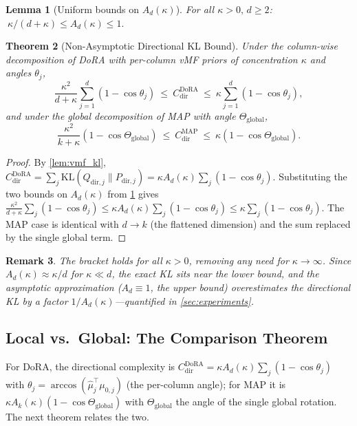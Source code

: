 \documentclass[10pt]{article}
\newtheorem{theorem}{Theorem}[section]
\newtheorem{lemma}[theorem]{Lemma}
\newtheorem{remark}[theorem]{Remark}
\newcommand{\KL}{\mathrm{KL}}
\newcommand{\Ad}{A_d}
\newcommand{\Ak}{A_k}
\newcommand{\Thetaglob}{\Theta_{\mathrm{global}}}
\begin{document}
\begin{lemma}[Uniform bounds on $\Ad(\kappa)$]\label{lem:ad_bounds}
For all $\kappa>0,\,d\ge2$: $\ \kappa/(d+\kappa)\le \Ad(\kappa)\le1.$
\end{lemma}

\setcounter{theorem}{3} %
\begin{theorem}[Non-Asymptotic Directional KL Bound]\label{thm:nonasymptotic}
Under the column-wise decomposition of DoRA with per-column vMF priors of
concentration $\kappa$ and angles $\theta_j$,
\[
\frac{\kappa^2}{d+\kappa}\sum_{j=1}^d(1-\cos\theta_j)
\ \le\ C^{\mathrm{DoRA}}_{\mathrm{dir}}
\ \le\ \kappa\sum_{j=1}^d(1-\cos\theta_j),
\]
and under the global decomposition of MAP with angle $\Thetaglob$,
\[
\frac{\kappa^2}{k+\kappa}(1-\cos\Thetaglob)
\ \le\ C^{\mathrm{MAP}}_{\mathrm{dir}}
\ \le\ \kappa(1-\cos\Thetaglob).
\]
\end{theorem}
\begin{proof}
By \cref{lem:vmf_kl}, $C^{\mathrm{DoRA}}_{\mathrm{dir}}=\sum_{j}\KL(Q_{\mathrm{dir},j}\|P_{\mathrm{dir},j})
=\kappa \Ad(\kappa)\sum_j(1-\cos\theta_j)$. Substituting the two bounds on $\Ad(\kappa)$
from \cref{lem:ad_bounds} gives
$\frac{\kappa^2}{d+\kappa}\sum_j(1-\cos\theta_j)\le\kappa \Ad(\kappa)\sum_j(1-\cos\theta_j)\le\kappa\sum_j(1-\cos\theta_j)$.
The MAP case is identical with $d\!\to\!k$ (the flattened dimension) and the sum
replaced by the single global term.
\end{proof}

\begin{remark}\label{rem:nonasym}
The bracket holds for all $\kappa>0$, removing any need for $\kappa\to\infty$. Since
$\Ad(\kappa)\approx\kappa/d$ for $\kappa\ll d$, the exact KL sits near the lower bound,
and the asymptotic approximation ($\Ad\!\equiv\!1$, the upper bound) overestimates the
directional KL by a factor $1/\Ad(\kappa)$---quantified in \cref{sec:experiments}.
\end{remark}

\subsection{Local vs.\ Global: The Comparison Theorem}
\label{sec:comparison}
For DoRA, the directional complexity is $C^{\mathrm{DoRA}}_{\mathrm{dir}}=\kappa \Ad(\kappa)\sum_j(1-\cos\theta_j)$
with $\theta_j=\arccos(\hat\mu_j^\top\mu_{0,j})$ (the per-column angle); for MAP it is
$\kappa \Ak(\kappa)(1-\cos\Thetaglob)$ with $\Thetaglob$ the angle of the single global
rotation. The next theorem relates the two.
\end{document}

